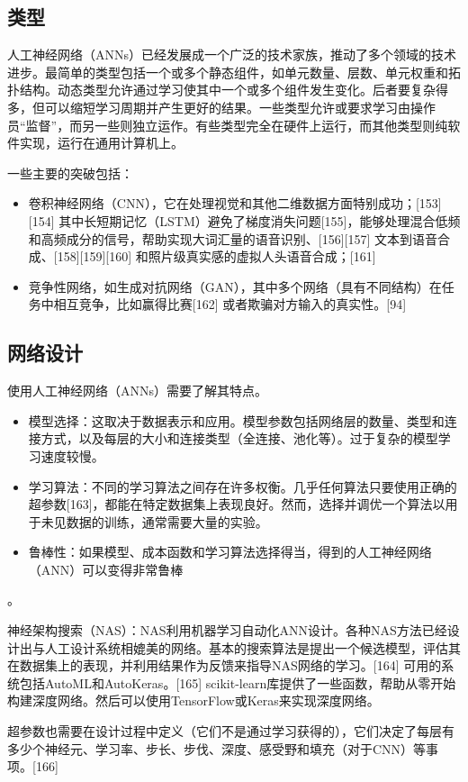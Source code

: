 \subsection{类型}   
人工神经网络（ANNs）已经发展成一个广泛的技术家族，推动了多个领域的技术进步。最简单的类型包括一个或多个静态组件，如单元数量、层数、单元权重和拓扑结构。动态类型允许通过学习使其中一个或多个组件发生变化。后者要复杂得多，但可以缩短学习周期并产生更好的结果。一些类型允许或要求学习由操作员“监督”，而另一些则独立运作。有些类型完全在硬件上运行，而其他类型则纯软件实现，运行在通用计算机上。

一些主要的突破包括：
\begin{itemize}
\item 卷积神经网络（CNN），它在处理视觉和其他二维数据方面特别成功；[153][154] 其中长短期记忆（LSTM）避免了梯度消失问题[155]，能够处理混合低频和高频成分的信号，帮助实现大词汇量的语音识别、[156][157] 文本到语音合成、[158][159][160] 和照片级真实感的虚拟人头语音合成；[161]  
\item 竞争性网络，如生成对抗网络（GAN），其中多个网络（具有不同结构）在任务中相互竞争，比如赢得比赛[162] 或者欺骗对方输入的真实性。[94]
\end{itemize}
\subsection{网络设计}  
使用人工神经网络（ANNs）需要了解其特点。

\begin{itemize}
\item 模型选择：这取决于数据表示和应用。模型参数包括网络层的数量、类型和连接方式，以及每层的大小和连接类型（全连接、池化等）。过于复杂的模型学习速度较慢。
\item 学习算法：不同的学习算法之间存在许多权衡。几乎任何算法只要使用正确的超参数[163]，都能在特定数据集上表现良好。然而，选择并调优一个算法以用于未见数据的训练，通常需要大量的实验。
\item 鲁棒性：如果模型、成本函数和学习算法选择得当，得到的人工神经网络（ANN）可以变得非常鲁棒
\end{itemize}。

神经架构搜索（NAS）：NAS利用机器学习自动化ANN设计。各种NAS方法已经设计出与人工设计系统相媲美的网络。基本的搜索算法是提出一个候选模型，评估其在数据集上的表现，并利用结果作为反馈来指导NAS网络的学习。[164] 可用的系统包括AutoML和AutoKeras。[165] scikit-learn库提供了一些函数，帮助从零开始构建深度网络。然后可以使用TensorFlow或Keras来实现深度网络。

超参数也需要在设计过程中定义（它们不是通过学习获得的），它们决定了每层有多少个神经元、学习率、步长、步伐、深度、感受野和填充（对于CNN）等事项。[166]

